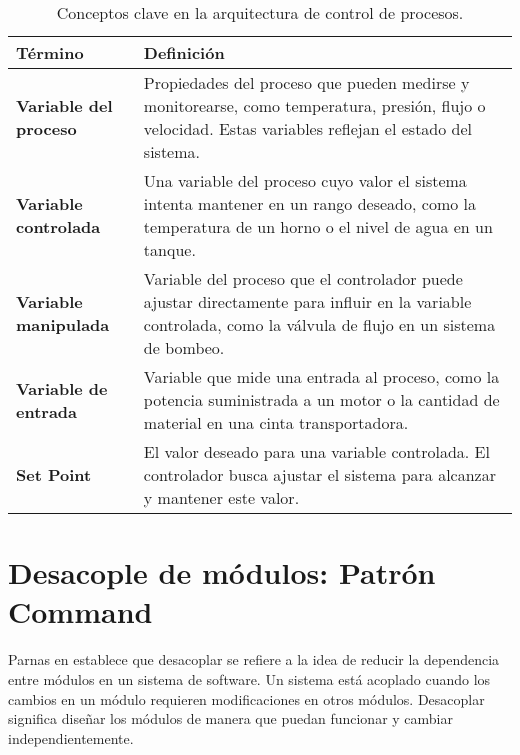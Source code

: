 \begin{table}[h!]

\caption{Conceptos clave en la arquitectura de control de procesos.}
\label{tab:conceptosArq}
\setlength{\extrarowheight}{5pt} %
\renewcommand{\arraystretch}{1.0} %
\begin{tabular}{|>{\raggedright\arraybackslash}p{4.5cm}|>{\raggedright\arraybackslash}p{10.5cm}|}
\hline
\textbf{Término}               & \textbf{Definición}                                                                                                                                       \\ \hline
\textbf{Variable del proceso}  & Propiedades del proceso que pueden medirse y monitorearse, como temperatura, presión, flujo o velocidad. Estas variables reflejan el estado del sistema. \\ \hline
\textbf{Variable controlada}   & Una variable del proceso cuyo valor el sistema intenta mantener en un rango deseado, como la temperatura de un horno o el nivel de agua en un tanque.    \\ \hline
\textbf{Variable manipulada}   & Variable del proceso que el controlador puede ajustar directamente para influir en la variable controlada, como la válvula de flujo en un sistema de bombeo. \\ \hline
\textbf{Variable de entrada}   & Variable que mide una entrada al proceso, como la potencia suministrada a un motor o la cantidad de material en una cinta transportadora.               \\ \hline
\textbf{Set Point}             & El valor deseado para una variable controlada. El controlador busca ajustar el sistema para alcanzar y mantener este valor.                              \\ \hline

\end{tabular}
\end{table}

\section{Desacople de módulos:  Patrón Command}

Parnas en \cite{Parnas1972} establece que desacoplar se refiere a la idea de reducir la dependencia entre módulos en un sistema de software. Un sistema está acoplado cuando los cambios en un módulo requieren modificaciones en otros módulos. Desacoplar significa diseñar los módulos de manera que puedan funcionar y cambiar independientemente.


